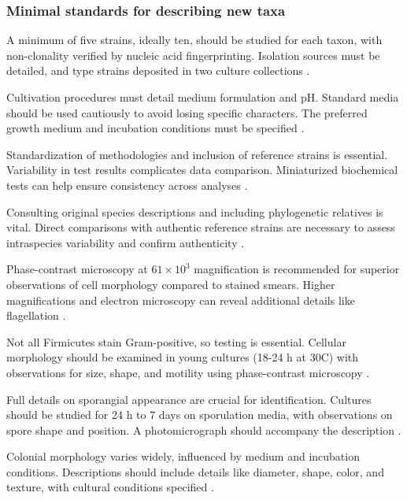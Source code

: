 \subsubsection{Minimal standards for describing new taxa}
A minimum of five strains, ideally ten, should be studied for each taxon, with non-clonality verified by nucleic acid fingerprinting. Isolation sources must be detailed, and type strains deposited in two culture collections \cite*{L10-PropMin}.

Cultivation procedures must detail medium formulation and pH. Standard media should be used cautiously to avoid losing specific characters. The preferred growth medium and incubation conditions must be specified \cite*{L10-PropMin}.

Standardization of methodologies and inclusion of reference strains is essential. Variability in test results complicates data comparison. Miniaturized biochemical tests can help ensure consistency across analyses \cite*{L10-PropMin}.

Consulting original species descriptions and including phylogenetic relatives is vital. Direct comparisons with authentic reference strains are necessary to assess intraspecies variability and confirm authenticity \cite*{L10-PropMin}.

Phase-contrast microscopy at $61\times10^3$ magnification is recommended for superior observations of cell morphology compared to stained smears. Higher magnifications and electron microscopy can reveal additional details like flagellation \cite*{L10-PropMin}.

Not all Firmicutes stain Gram-positive, so testing is essential. Cellular morphology should be examined in young cultures (18-24 h at 30\textdegree C) with observations for size, shape, and motility using phase-contrast microscopy \cite*{L10-PropMin}.

Full details on sporangial appearance are crucial for identification. Cultures should be studied for 24 h to 7 days on sporulation media, with observations on spore shape and position. A photomicrograph should accompany the description \cite*{L10-PropMin}.

Colonial morphology varies widely, influenced by medium and incubation conditions. Descriptions should include details like diameter, shape, color, and texture, with cultural conditions specified \cite*{L10-PropMin}.

